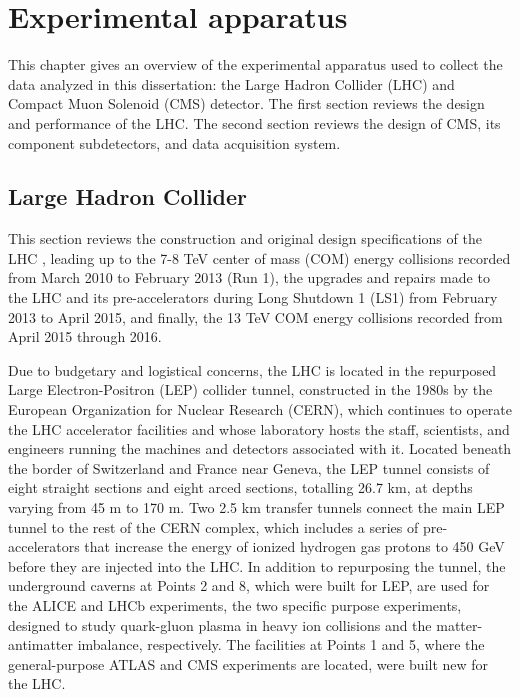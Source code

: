 \chapter{Experimental apparatus}

This chapter gives an overview of the experimental apparatus used to collect the data analyzed in this dissertation: the Large Hadron Collider (LHC) and Compact Muon Solenoid (CMS) detector. The first section reviews the design and performance of the LHC. The second section reviews the design of CMS, its component subdetectors, and data acquisition system.  

\section{Large Hadron Collider}

This section reviews the construction and original design specifications of the LHC \cite{1748-0221-3-08-S08001}, leading up to the 7-8 TeV center of mass (COM) energy collisions recorded from March 2010 to February 2013 (Run 1), the upgrades and repairs made to the LHC and its pre-accelerators during Long Shutdown 1 (LS1) from February 2013 to April 2015, and finally, the 13 TeV COM energy collisions recorded from April 2015 through 2016. 

\indent Due to budgetary and logistical concerns, the LHC is located in the repurposed Large Electron-Positron (LEP) collider tunnel, constructed in the 1980s by the European Organization for Nuclear Research (CERN), which continues to operate the LHC accelerator facilities and whose laboratory hosts the staff, scientists, and engineers running the machines and detectors associated with it. Located beneath the border of Switzerland and France near Geneva, the LEP tunnel consists of eight straight sections and eight arced sections, totalling 26.7 km, at depths varying from 45 m to 170 m. Two 2.5 km transfer tunnels connect the main LEP tunnel to the rest of the CERN complex, which includes a series of pre-accelerators that increase the energy of ionized hydrogen gas protons to 450 GeV before they are injected into the LHC. In addition to repurposing the tunnel, the underground caverns at Points 2 and 8, which were built for LEP, are used for the ALICE and LHCb experiments, the two specific purpose experiments, designed to study quark-gluon plasma in heavy ion collisions and the matter-antimatter imbalance, respectively. The facilities at Points 1 and 5, where the general-purpose ATLAS and CMS experiments are located, were built new for the LHC. 

